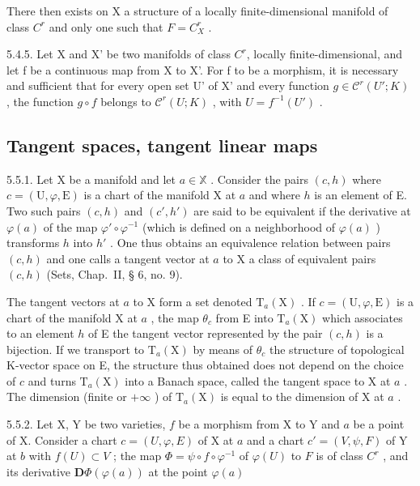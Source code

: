 There then exists on X a structure of a locally finite-dimensional manifold of class \(C^{r}\) and only one such that \(F = C_{X}^{r}\) .

5.4.5. Let X and X' be two manifolds of class \(C^{r}\), locally finite-dimensional, and let f be a continuous map from X to X'. For f to be a morphism, it is necessary and sufficient that for every open set U' of X' and every function \(g \in \mathcal{C}^{r}(U'; K)\) , the function \(g \circ f\) belongs to \(\mathcal{C}^{r}(U; K)\) , with \(U = f^{-1}(U')\) .

\subsection{Tangent spaces, tangent linear maps}

5.5.1. Let X be a manifold and let \(a\in\mathbb{X}\) . Consider the pairs \((c,h)\) where \(c=(\mathrm{U},\varphi,\mathrm{E})\) is a chart of the manifold X at \(a\) and where \(h\) is an element of E. Two such pairs \((c,h)\) and \((c',h')\) are said to be equivalent if the derivative at \(\varphi(a)\) of the map \(\varphi'\circ\varphi^{-1}\) (which is defined on a neighborhood of \(\varphi(a)\) ) transforms \(h\) into \(h'\) . One thus obtains an equivalence relation between pairs \((c,h)\) and one calls a tangent vector at \(a\) to X a class of equivalent pairs \((c,h)\) (Sets, Chap.~II, § 6, no. 9).

The tangent vectors at \(a\) to X form a set denoted \(\mathrm{T}_{a}(\mathrm{X})\) . If \(c = (\mathrm{U}, \varphi, \mathrm{E})\) is a chart of the manifold X at \(a\) , the map \(\theta_{c}\) from E into \(\mathrm{T}_{a}(\mathrm{X})\) which associates to an element \(h\) of E the tangent vector represented by the pair \((c, h)\) is a bijection. If we transport to \(\mathrm{T}_{a}(\mathrm{X})\) by means of \(\theta_{c}\) the structure of topological K-vector space on E, the structure thus obtained does not depend on the choice of \(c\) and turns \(\mathrm{T}_{a}(\mathrm{X})\) into a Banach space, called the tangent space to X at \(a\) . The dimension (finite or \(+\infty\) ) of \(\mathrm{T}_{a}(\mathrm{X})\) is equal to the dimension of X at \(a\) .

5.5.2. Let X, Y be two varieties, \(f\) be a morphism from X to Y and \(a\) be a point of X. Consider a chart \(c = (U, \varphi, E)\) of X at \(a\) and a chart \(c' = (V, \psi, F)\) of Y at \(b\) with \(f(U) \subset V\) ; the map \(\Phi = \psi \circ f \circ \varphi^{-1}\) of \(\varphi(U)\) to \(F\) is of class \(C^{r}\) , and its derivative \(\mathbf{D}\Phi(\varphi(a))\) at the point \(\varphi(a)\)

